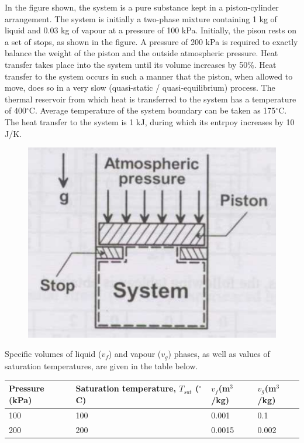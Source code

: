 \documentclass[journal,12pt,onecolumn]{IEEEtran}
\begin{document}
\begin{enumerate}
          In the figure shown, the system is a pure substance kept in a piston-cylinder arrangement. The system is initially a two-phase mixture containing 1 kg of liquid and 0.03 kg of vapour at a pressure of 100 kPa. Initially, the pison rests on a set of stops, as shown in the figure. A pressure of 200 kPa is required to exactly balance the weight of the piston and the outside atmospheric pressure. Heat transfer takes place into the system until its volume increases by 50\%. Heat transfer to the system occurs in such a manner that the piston, when allowed to move, does so in a very slow (quasi-static / quasi-equilibrium) process. The thermal reservoir from which heat is transferred to the system has a temperature of 400$^\circ$C. Average temperature of the system boundary can be taken as 175$^\circ$C. The heat transfer to the system is 1 kJ, during which its entrpoy increases by 10 J/K.

          \begin{figure}[H]
              \centering
              \includegraphics[scale=0.3]{q71}
              \caption{}
              \label{q71}
          \end{figure}
          Specific volumes of liquid ($v_f$) and vapour ($v_g$) phases, as well as values of saturation temperatures, are given in the table below.
          \begin{table}[H]
              \centering\large
              \begin{tabular}{|l|l|l|l|}
                  \hline
                  Pressure (kPa) & Saturation temperature, $T_{sat}$ ($^\circ$C) & $v_f$(m$^3$/kg) & $v_g$(m$^3$/kg) \\\hline
                  100            & 100                                           & 0.001           & 0.1             \\\hline
                  200            & 200                                           & 0.0015          & 0.002           \\\hline
              \end{tabular}
              \label{t71}
          \end{table}


\end{enumerate}
\end{document}
